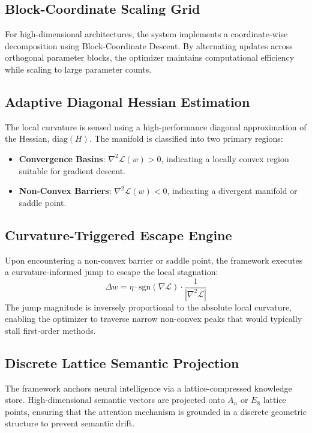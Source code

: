 \documentclass[10pt,twocolumn,letterpaper]{article}
\begin{document}
\subsection{Block-Coordinate Scaling Grid}
For high-dimensional architectures, the system implements a coordinate-wise decomposition using Block-Coordinate Descent. By alternating updates across orthogonal parameter blocks, the optimizer maintains computational efficiency while scaling to large parameter counts.

\subsection{Adaptive Diagonal Hessian Estimation}
The local curvature is sensed using a high-performance diagonal approximation of the Hessian, $\text{diag}(H)$. The manifold is classified into two primary regions:
\begin{itemize}
    \item \textbf{Convergence Basins}: $\nabla^2 \mathcal{L}(w) > 0$, indicating a locally convex region suitable for gradient descent.
    \item \textbf{Non-Convex Barriers}: $\nabla^2 \mathcal{L}(w) < 0$, indicating a divergent manifold or saddle point.
\end{itemize}

\subsection{Curvature-Triggered Escape Engine}
Upon encountering a non-convex barrier or saddle point, the framework executes a curvature-informed jump to escape the local stagnation:
\begin{equation}
\Delta w = \eta \cdot \text{sgn}(\nabla \mathcal{L}) \cdot \frac{1}{|\nabla^2 \mathcal{L}|}
\end{equation}
The jump magnitude is inversely proportional to the absolute local curvature, enabling the optimizer to traverse narrow non-convex peaks that would typically stall first-order methods.

\subsection{Discrete Lattice Semantic Projection}
The framework anchors neural intelligence via a lattice-compressed knowledge store. High-dimensional semantic vectors are projected onto $A_n$ or $E_8$ lattice points, ensuring that the attention mechanism is grounded in a discrete geometric structure to prevent semantic drift.
\end{document}
